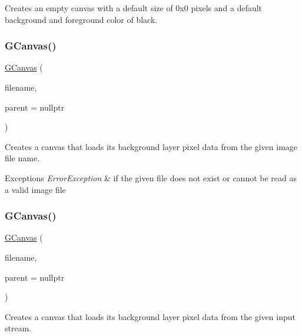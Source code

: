 Creates an empty canvas with a default size of 0x0 pixels and a default background and foreground color of black. 

\mbox{\label{classGCanvas_a0a9de139286d0fc9146928aff8f0538c}} 
\subsubsection{\texorpdfstring{G\+Canvas()}{GCanvas()}\hspace{0.1cm}{\footnotesize\ttfamily [2/5]}}
{\footnotesize\ttfamily \mbox{\hyperlink{classGCanvas}{G\+Canvas}} (\begin{DoxyParamCaption}\item[{const std\+::string \&}]{filename,  }\item[{Q\+Widget $\ast$}]{parent = {\ttfamily nullptr} }\end{DoxyParamCaption})}



Creates a canvas that loads its background layer pixel data from the given image file name. 


\begin{DoxyExceptions}{Exceptions}
{\em Error\+Exception} & if the given file does not exist or cannot be read as a valid image file \\
\hline
\end{DoxyExceptions}
\mbox{\label{classGCanvas_a18f1866349219dd73545c6b548ff3b0e}} 
\subsubsection{\texorpdfstring{G\+Canvas()}{GCanvas()}\hspace{0.1cm}{\footnotesize\ttfamily [3/5]}}
{\footnotesize\ttfamily \mbox{\hyperlink{classGCanvas}{G\+Canvas}} (\begin{DoxyParamCaption}\item[{std\+::istream \&}]{filename,  }\item[{Q\+Widget $\ast$}]{parent = {\ttfamily nullptr} }\end{DoxyParamCaption})}



Creates a canvas that loads its background layer pixel data from the given input stream. 


